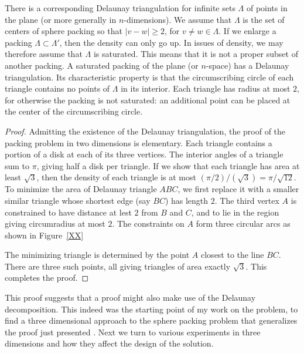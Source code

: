 There is a corresponding Delaunay triangulation for infinite sets $\Lambda$
of points in the plane (or more generally in $n$-dimensions).  We
assume that $\Lambda$ is the set of centers of sphere packing so that
$|v-w|\ge2$, for $v\ne w\in \Lambda$.  If we enlarge a packing
$\Lambda\subset\Lambda'$, then the density can only go up.  In issues
of density, we may therefore assume that $\Lambda$ is saturated.  This
means that it is not a proper subset of another packing.  A saturated
packing of the plane (or $n$-space) has a Delaunay triangulation.  Its
characteristic property is that the circumscribing circle of each triangle
contains no points of $\Lambda$ in its interior.   Each triangle has
radius at most $2$, for otherwise the packing is not saturated: an additional
point can be placed at the center of the circumscribing circle.

\begin{proof}
Admitting the existence of the Delaunay triangulation, the proof 
of the packing problem in two dimensions is
elementary.  Each triangle contains a portion of a disk at each of
its three vertices.  The interior angles of a triangle sum to $\pi$, giving
half a disk per triangle.  If we show that each triangle has area at least
$\sqrt{3}$, then the density of each triangle is at most
 $(\pi/2)/(\sqrt{3}) = \pi/\sqrt{12}$.  To minimize the area of Delaunay
triangle $ABC$, we first replace it with a smaller similar triangle whose
shortest edge (say $BC$) has length $2$.  The third vertex $A$ is constrained
to have distance at lest $2$ from $B$ and $C$, and to lie in the region
giving circumradius at most $2$.  The constraints on $A$ form three circular
arcs as shown in Figure~\ref{XX} %

The minimizing triangle is determined by the point $A$ closest to the
line $BC$.  There are three such points, all giving triangles of area
exactly $\sqrt3$.  This completes the proof.
\end{proof}

This proof suggests that a proof might also make use of the Delaunay
decomposition.  This indeed was the starting point of my work on the
problem, to find a three dimensional approach to the sphere packing
problem that generalizes the proof just presented \cite{Hal93}.
Next we turn to various experiments in three dimensions and how
they affect the design of the solution.




\clearpage




